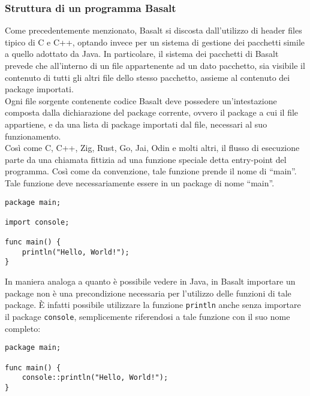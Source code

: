 \subsubsection{Struttura di un programma Basalt}
Come precedentemente menzionato, Basalt si discosta dall'utilizzo di header files tipico di C e C++, optando invece per un sistema di gestione dei pacchetti simile a quello adottato da Java. In particolare, 
il sistema dei pacchetti di Basalt prevede che all’interno di un file appartenente ad un dato pacchetto, sia visibile il contenuto di tutti gli altri file dello stesso pacchetto, assieme al contenuto 
dei package importati. \\

Ogni file sorgente contenente codice Basalt deve possedere un'intestazione composta dalla dichiarazione del package corrente, ovvero il package a cui il file appartiene, e 
da una lista di package importati dal file, necessari al suo funzionamento. \\
 
Così come C, C++, Zig, Rust, Go, Jai, Odin e molti altri, il flusso di esecuzione parte da una chiamata fittizia ad una funzione speciale detta entry-point del programma. Così 
come da convenzione, tale funzione prende il nome di “main”. Tale funzione deve necessariamente essere in un package di nome “main”. \\


\begin{lstlisting}[frame=single]
package main;

import console;

func main() {
    println("Hello, World!");
}
\end{lstlisting}

\vspace{0.5cm}

In maniera analoga a quanto è possibile vedere in Java, in Basalt importare un package non 
è una precondizione necessaria per l'utilizzo delle funzioni di tale package. È infatti possibile
utilizzare la funzione \texttt{println} anche senza importare il package \texttt{console}, semplicemente riferendosi
a tale funzione con il suo nome completo: \\

\begin{lstlisting}[frame=single]
package main;

func main() {
    console::println("Hello, World!");
}
\end{lstlisting}
    